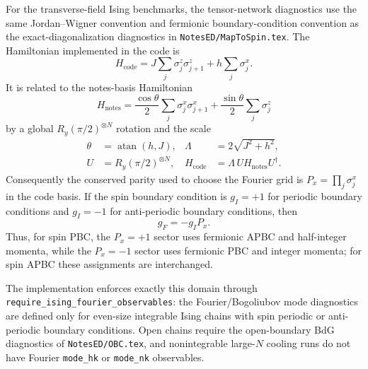 \documentclass[aps,pra,twocolumn,superscriptaddress,nolongbibliography,nobalancelastpage,10pt]{revtex4-2}
\begin{document}
For the transverse-field Ising benchmarks, the tensor-network diagnostics use the
same Jordan--Wigner convention and fermionic boundary-condition convention as
the exact-diagonalization diagnostics in \texttt{NotesED/MapToSpin.tex}.  The
Hamiltonian implemented in the code is
\begin{equation}
	H_{\mathrm{code}}=J\sum_j\sigma^z_j\sigma^z_{j+1}+h\sum_j\sigma^x_j.
\end{equation}
It is related to the notes-basis Hamiltonian
\begin{equation}
	H_{\mathrm{notes}}=\frac{\cos\theta}{2}\sum_j\sigma^x_j\sigma^x_{j+1}
	+\frac{\sin\theta}{2}\sum_j\sigma^z_j
\end{equation}
by a global $R_y(\pi/2)^{\otimes N}$ rotation and the scale
\begin{align}
	\theta&=\operatorname{atan}(h,J),&
	\Lambda&=2\sqrt{J^2+h^2},\\
	U&=R_y(\pi/2)^{\otimes N},&
	H_{\mathrm{code}}
	&=\Lambda\,U H_{\mathrm{notes}}U^\dagger .
\end{align}
Consequently the conserved parity used to choose the Fourier grid is
$P_x=\prod_j\sigma^x_j$ in the code basis.  If the spin boundary condition is
$g_I=+1$ for periodic boundary conditions and $g_I=-1$ for anti-periodic
boundary conditions, then
\begin{equation}
	g_F=-g_I P_x.
\end{equation}
Thus, for spin PBC, the $P_x=+1$ sector uses fermionic APBC and half-integer
momenta, while the $P_x=-1$ sector uses fermionic PBC and integer momenta; for
spin APBC these assignments are interchanged.

The implementation enforces exactly this domain through
\texttt{require\_ising\_fourier\_observables}: the Fourier/Bogoliubov mode
diagnostics are defined only for even-size integrable Ising chains with spin
periodic or anti-periodic boundary conditions.  Open chains require the
open-boundary BdG diagnostics of \texttt{NotesED/OBC.tex}, and nonintegrable
large-\(N\) cooling runs do not have Fourier \texttt{mode\_hk} or
\texttt{mode\_nk} observables.
\end{document}
